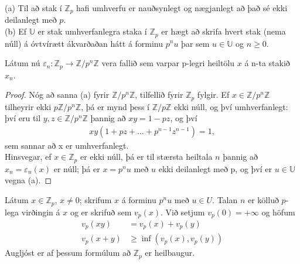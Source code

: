 \begin{setn}
 (a) Til að stak í $\mathbb{Z}_p$ hafi umhverfu er nauðsynlegt og nægjanlegt 
að það sé ekki deilanlegt með $p$.\\
 (b) Ef $\mathbb{U}$ er stak umhverfanlegra staka í $\mathbb{Z}_p$ er hægt að 
skrifa hvert stak (nema núll) á óvtvírætt ákvarðaðan hátt á forminu $p^nu$ þar
 sem $u \in \mathbb{U}$ og $n\geq 0$.
\end{setn}
Látum nú $\varepsilon_n : \mathbb{Z}_p \rightarrow \mathbb{Z}/p^n 
\mathbb{Z}$ vera fallið sem varpar p-legri heiltölu $x$ á n-ta stakið $x_n$.
\begin{proof}
 Nóg að sanna (a) fyrir $\mathbb{Z}/p^n\mathbb{Z}$, tilfellið fyrir 
$\mathbb{Z}_p$ fylgir. Ef $x \in \mathbb{Z}/p^n\mathbb{Z}$ tilheyrir 
ekki $p\mathbb{Z}/p^n\mathbb{Z}$, þá er mynd þess í 
$\mathbb{Z}/p\mathbb{Z}$ ekki núll, og því umhverfanlegt: 
því eru til $y,z \in \mathbb{Z}/p^n\mathbb{Z}$ þannig að 
$xy = 1-pz$, og því 
\begin{align*}
 xy(1+pz+\ldots+p^{n-1}z^{n-1}) = 1,
\end{align*}
sem sannar að x er umhverfanlegt.\\
Hinsvegar, ef $x \in \mathbb{Z}_p$ er ekki núll, þá er til stærsta heiltala 
$n$ þannig að $x_n = \varepsilon_n(x)$ er núll; þá er $x = p^nu$ með $u$ ekki 
deilanlegt með p, og því er $u \in \mathbb{U}$ vegna (a). 
\end{proof}
\begin{Rit}
Látum $x \in \mathbb{Z}_p$, $x \neq 0$; skrifum $x$ á forminu $p^nu$ með 
$u \in U$. Talan $n$ er kölluð $p$-lega virðingin á $x$ og er skrifuð sem 
$v_p(x)$. Við setjum $v_p(0) = +\infty$ og höfum 
\begin{align*}
 v_p(xy) &= v_p(x) + v_p(y) \\
 v_p(x+y) &\geq \inf(v_p(x),v_p(y))
\end{align*}
Augljóst er af þessum formúlum að $\mathbb{Z}_p$ er heilbaugur.
\end{Rit}

